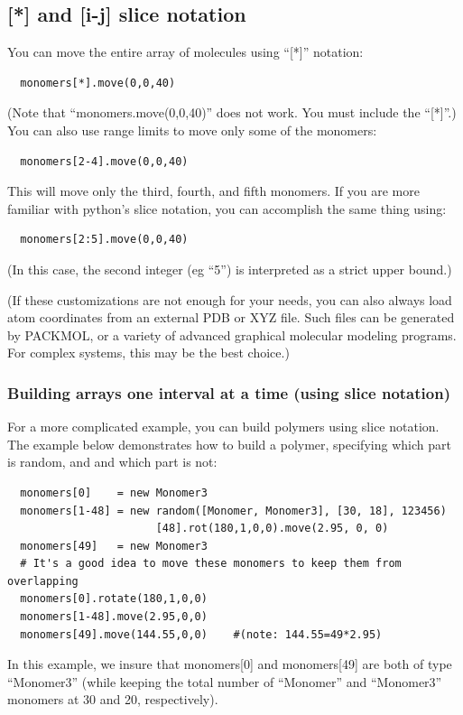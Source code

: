 \documentclass[11pt]{article}
\begin{document}
\subsection{[*] and [i-j] slice notation}
\label{sec:array_wildcards_intro}
You can move the entire array of molecules using ``[*]'' notation:
\begin{verbatim}
  monomers[*].move(0,0,40)
\end{verbatim}
(Note that ``monomers.move(0,0,40)'' does not work.
 You must include the ``[*]''.)
You can also use range limits to move only some of the monomers:
\begin{verbatim}
  monomers[2-4].move(0,0,40)
\end{verbatim}
This will move only the third, fourth, and fifth monomers.
If you are more familiar with python's slice notation, you can 
accomplish the same thing using:
\begin{verbatim}
  monomers[2:5].move(0,0,40)
\end{verbatim}
(In this case, the second integer (eg ``5'') is interpreted as a 
 strict upper bound.)

(If these customizations
 are not enough for your needs, you can also always load atom 
coordinates from an external PDB or XYZ file.
Such files can be generated by PACKMOL, 
or a variety of advanced graphical molecular modeling programs. 
For complex systems, this may be the best choice.)




\subsubsection{Building arrays one interval at a time (using slice notation)}

For a more complicated example, you can build polymers using slice notation.
The example below demonstrates how to build a polymer,
specifying which part is random, and and which part is not:

\begin{verbatim}
  monomers[0]    = new Monomer3
  monomers[1-48] = new random([Monomer, Monomer3], [30, 18], 123456)
                       [48].rot(180,1,0,0).move(2.95, 0, 0)
  monomers[49]   = new Monomer3
  # It's a good idea to move these monomers to keep them from overlapping
  monomers[0].rotate(180,1,0,0)
  monomers[1-48].move(2.95,0,0)
  monomers[49].move(144.55,0,0)    #(note: 144.55=49*2.95)
\end{verbatim}
In this example, we insure that monomers[0] and monomers[49] are both
of type ``Monomer3'' 
(while keeping the total number of ``Monomer'' and ``Monomer3'' monomers at 
 30 and 20, respectively).
\end{document}
